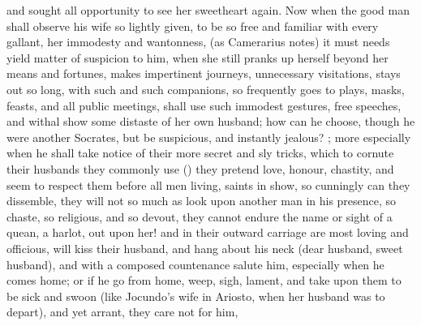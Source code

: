 and sought all opportunity to see her sweetheart again. Now when the
good man shall observe his wife so lightly given, to be so free and
familiar with every gallant, her immodesty and wantonness, (as
Camerarius notes) it must needs yield matter of suspicion to him,
when she still pranks up herself beyond her means and fortunes, makes
impertinent journeys, unnecessary visitations, stays out so long, with
such and such companions, so frequently goes to plays, masks, feasts,
and all public meetings, shall use such immodest gestures, free
speeches, and withal show some distaste of her own husband; how can he
choose, though he were another Socrates, but be suspicious, and
instantly jealous? ;
more especially when he shall take notice of their more secret and sly
tricks, which to cornute their husbands they commonly use () they pretend love, honour, chastity, and seem to
respect them before all men living, saints in show, so cunningly can
they dissemble, they will not so much as look upon another man in his
presence, so chaste, so religious, and so devout, they cannot
endure the name or sight of a quean, a harlot, out upon her! and in
their outward carriage are most loving and officious, will kiss their
husband, and hang about his neck (dear husband, sweet husband), and
with a composed countenance salute him, especially when he comes home;
or if he go from home, weep, sigh, lament, and take upon them to be
sick and swoon (like Jocundo's wife in Ariosto, when her husband
was to depart), and yet arrant, \etc{} they care not for him,
%
